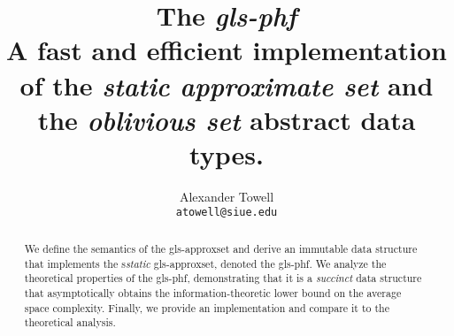 \documentclass[11pt,final,hidelinks]{article}
\title
{
    The \emph{\gls*{gls-phf}}\\
    \large A fast and efficient implementation of the \emph{static approximate set} and the \emph{oblivious set} abstract data types.
}
\author
{
    Alexander Towell\\
    \texttt{atowell@siue.edu}
}
\date{}
\begin{document}
\maketitle
\begin{abstract}
We define the semantics of the \gls*{gls-approxset} and derive an immutable data structure that implements the s\emph{static} \gls*{gls-approxset}, denoted the \gls*{gls-phf}. We analyze the theoretical properties of the \gls*{gls-phf}, demonstrating that it is a \emph{succinct} data structure that asymptotically obtains the information-theoretic lower bound on the average space complexity. Finally, we provide an implementation and compare it to the theoretical analysis.
\end{abstract}

\tableofcontents
\listoffigures
\listofalgorithms



%
%




\printglossary

\end{document}
